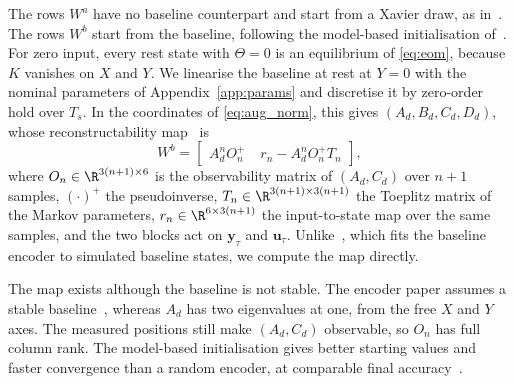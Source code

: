 The rows $W^a$ have no baseline counterpart and start from a Xavier draw, as
in~\cite[Eq.~(31)]{hoekstra2026lfr}.
The rows $W^b$ start from the baseline, following the model-based
initialisation of~\cite[Sec.~3.1]{hoekstra2026encoder}.
For zero input, every rest state with $\Theta=0$ is an equilibrium of
\eqref{eq:eom}, because $K$ vanishes on $X$ and $Y$.
We linearise the baseline at rest at $Y=0$ with the nominal parameters of
Appendix~\ref{app:params} and discretise it by zero-order hold over $T_s$.
In the coordinates of \eqref{eq:aug_norm}, this gives $(A_d,B_d,C_d,D_d)$,
whose reconstructability map~\cite[Eqs.~(16), (17)]{hoekstra2026encoder} is
\begin{equation}
 W^b=\begin{bmatrix}
  A_d^nO_n^{+} & \;r_n-A_d^nO_n^{+}T_n
 \end{bmatrix},
 \label{eq:aug_wb}
\end{equation}
where $O_n\in\R^{3(n+1)\times6}$ is the observability matrix of $(A_d,C_d)$
over $n+1$ samples, $(\cdot)^+$ the pseudoinverse,
$T_n\in\R^{3(n+1)\times3(n+1)}$ the Toeplitz matrix of the Markov parameters,
$r_n\in\R^{6\times3(n+1)}$ the input-to-state map over the same samples, and
the two blocks act on $\mathbf y_\tau$ and $\mathbf u_\tau$.
Unlike~\cite[Eq.~(30)]{hoekstra2026lfr}, which fits the baseline encoder to
simulated baseline states, we compute the map directly.

The map exists although the baseline is not stable.
The encoder paper assumes a stable baseline~\cite[Sec.~2]{hoekstra2026encoder},
whereas $A_d$ has two eigenvalues at one, from the free $X$ and $Y$ axes.
The measured positions still make $(A_d,C_d)$ observable, so $O_n$ has full
column rank.
The model-based initialisation gives better starting values and faster
convergence than a random encoder, at comparable final
accuracy~\cite[Sec.~4.4]{hoekstra2026encoder}.

